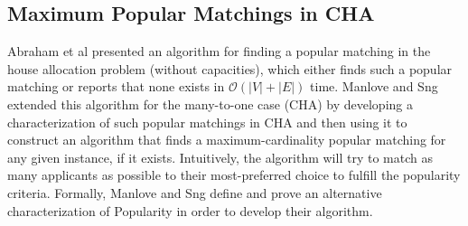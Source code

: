 \subsection{Maximum Popular Matchings in CHA}\label{algo-max-pop}
Abraham et al \cite{AbrahamPopular} presented an algorithm for finding a popular matching in the house allocation problem (without capacities), which either finds such a popular matching or reports that none exists in $\mathcal{O}(|V| + |E|)$ time. Manlove and Sng \cite{ManlovePopularMatchings} extended this algorithm for the many-to-one case (CHA) by developing a characterization of such popular matchings in CHA and then using it to construct an algorithm that finds a maximum-cardinality popular matching for any given instance, if it exists. 
Intuitively, the algorithm will try to match as many applicants as possible to their most-preferred choice to fulfill the popularity criteria. Formally, Manlove and Sng \cite{ManlovePopularMatchings} define and prove an alternative characterization of Popularity in order to develop their algorithm.


